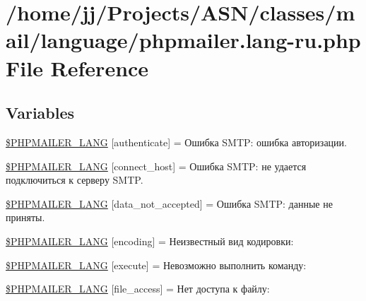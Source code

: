 \hypertarget{phpmailer_8lang-ru_8php}{}\section{/home/jj/\+Projects/\+A\+S\+N/classes/mail/language/phpmailer.lang-\/ru.php File Reference}
\label{phpmailer_8lang-ru_8php}
\subsection*{Variables}
\begin{DoxyCompactItemize}
\item 
\hyperlink{phpmailer_8lang-ru_8php_a2cb33073c989b85580748e331ed8b4aa}{\$\+P\+H\+P\+M\+A\+I\+L\+E\+R\+\_\+\+L\+A\+NG} \mbox{[}\textquotesingle{}authenticate\textquotesingle{}\mbox{]} = \textquotesingle{}Ошибка S\+M\+T\+P\+: ошибка авторизации.\textquotesingle{}
\item 
\hyperlink{phpmailer_8lang-ru_8php_a2ee0cc637a06b96e45600db31c6799ee}{\$\+P\+H\+P\+M\+A\+I\+L\+E\+R\+\_\+\+L\+A\+NG} \mbox{[}\textquotesingle{}connect\+\_\+host\textquotesingle{}\mbox{]} = \textquotesingle{}Ошибка S\+M\+T\+P\+: не удается подключиться к серверу S\+M\+T\+P.\textquotesingle{}
\item 
\hyperlink{phpmailer_8lang-ru_8php_a814c6b191205d2361b3233e9c9d6fda5}{\$\+P\+H\+P\+M\+A\+I\+L\+E\+R\+\_\+\+L\+A\+NG} \mbox{[}\textquotesingle{}data\+\_\+not\+\_\+accepted\textquotesingle{}\mbox{]} = \textquotesingle{}Ошибка S\+M\+T\+P\+: данные не приняты.\textquotesingle{}
\item 
\hyperlink{phpmailer_8lang-ru_8php_a817f7283f3d54c970a0c10305cc668cc}{\$\+P\+H\+P\+M\+A\+I\+L\+E\+R\+\_\+\+L\+A\+NG} \mbox{[}\textquotesingle{}encoding\textquotesingle{}\mbox{]} = \textquotesingle{}Неизвестный вид кодировки\+: \textquotesingle{}
\item 
\hyperlink{phpmailer_8lang-ru_8php_a668217a9563a168f30f2a8548b6ed5a9}{\$\+P\+H\+P\+M\+A\+I\+L\+E\+R\+\_\+\+L\+A\+NG} \mbox{[}\textquotesingle{}execute\textquotesingle{}\mbox{]} = \textquotesingle{}Невозможно выполнить команду\+: \textquotesingle{}
\item 
\hyperlink{phpmailer_8lang-ru_8php_a7e83349023b856ef9e5c46e30ae6d51e}{\$\+P\+H\+P\+M\+A\+I\+L\+E\+R\+\_\+\+L\+A\+NG} \mbox{[}\textquotesingle{}file\+\_\+access\textquotesingle{}\mbox{]} = \textquotesingle{}Нет доступа к файлу\+: \textquotesingle{}

\end{DoxyCompactItemize}
